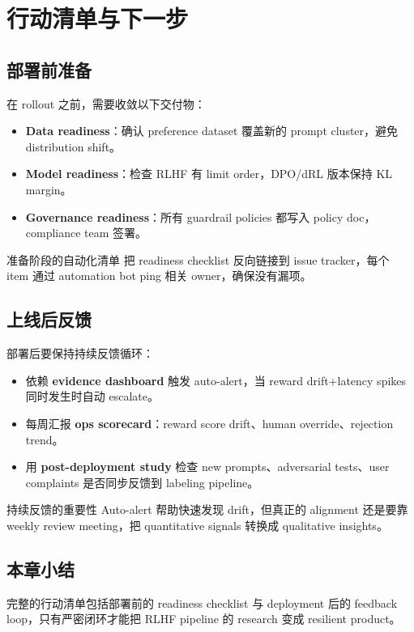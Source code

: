 \section{行动清单与下一步}

\subsection{部署前准备}

在 rollout 之前，需要收敛以下交付物：
\begin{itemize}
    \item \textbf{Data readiness}：确认 preference dataset 覆盖新的 prompt cluster，避免 distribution shift。
    \item \textbf{Model readiness}：检查 RLHF 有 limit order，DPO/dRL 版本保持 KL margin。
    \item \textbf{Governance readiness}：所有 guardrail policies 都写入 policy doc，compliance team 签署。
\end{itemize}

\begin{knowledgebox}{准备阶段的自动化清单}
把 readiness checklist 反向链接到 issue tracker，每个 item 通过 automation bot ping 相关 owner，确保没有漏项。
\end{knowledgebox}

\subsection{上线后反馈}

部署后要保持持续反馈循环：
\begin{itemize}
    \item 依赖 \textbf{evidence dashboard} 触发 auto-alert，当 reward drift+latency spikes 同时发生时自动 escalate。
    \item 每周汇报 \textbf{ops scorecard}：reward score drift、human override、rejection trend。
    \item 用 \textbf{post-deployment study} 检查 new prompts、adversarial tests、user complaints 是否同步反馈到 labeling pipeline。
\end{itemize}

\begin{importantbox}{持续反馈的重要性}
Auto-alert 帮助快速发现 drift，但真正的 alignment 还是要靠 weekly review meeting，把 quantitative signals 转换成 qualitative insights。
\end{importantbox}

\subsection{本章小结}

完整的行动清单包括部署前的 readiness checklist 与 deployment 后的 feedback loop，只有严密闭环才能把 RLHF pipeline 的 research 变成 resilient product。

